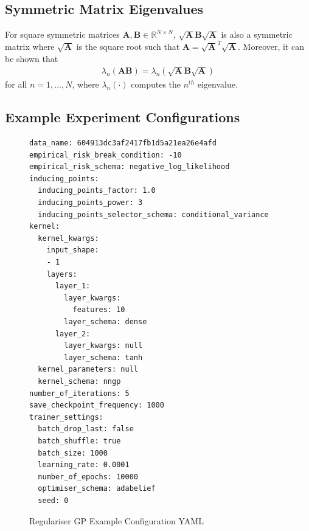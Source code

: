 \documentclass{article}
\numberwithin{equation}{section}
\begin{document}
\newpage
\subsection{Symmetric Matrix Eigenvalues}\label{appendix:eigenvalue-symmetric-matrix}
For square symmetric matrices $\mathbf{A}, \mathbf{B} \in \mathbb{R}^{N \times N}$, $\sqrt{\mathbf{A}}\mathbf{B}\sqrt{\mathbf{A}}$ is also a symmetric matrix where $\sqrt{\mathbf{A}}$ is the square root such that $\mathbf{A} = \sqrt{\mathbf{A}}^T \sqrt{\mathbf{A}}$. Moreover, it can be shown that
\begin{align}
    \lambda_{n} \left(\mathbf{A} \mathbf{B}\right) = \lambda_{n} \left(\sqrt{\mathbf{A}}\mathbf{B}\sqrt{\mathbf{A}}\right)
\end{align}
for all $n=1,\dots,N$, where $\lambda_{n}(\cdot)$ computes the $n^{th}$ eigenvalue.

\newpage
\subsection{Example Experiment Configurations}\label{appendix:configuration-yamls}
\begin{figure}[!h]
\begin{lstlisting}[style=yaml]
data_name: 604913dc3af2417fb1d5a21ea26e4afd
empirical_risk_break_condition: -10
empirical_risk_schema: negative_log_likelihood
inducing_points:
  inducing_points_factor: 1.0
  inducing_points_power: 3
  inducing_points_selector_schema: conditional_variance
kernel:
  kernel_kwargs:
    input_shape:
    - 1
    layers:
      layer_1:
        layer_kwargs:
          features: 10
        layer_schema: dense
      layer_2:
        layer_kwargs: null
        layer_schema: tanh
  kernel_parameters: null
  kernel_schema: nngp
number_of_iterations: 5
save_checkpoint_frequency: 1000
trainer_settings:
  batch_drop_last: false
  batch_shuffle: true
  batch_size: 1000
  learning_rate: 0.0001
  number_of_epochs: 10000
  optimiser_schema: adabelief
  seed: 0
\end{lstlisting}
\caption{Regulariser GP Example Configuration YAML}
\end{figure}
\end{document}
